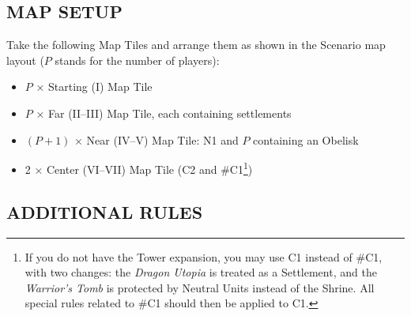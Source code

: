 \begin{multicols*}{2}
\subsection*{\MakeUppercase{Map Setup}}

Take the following Map Tiles and arrange them as shown in the Scenario map layout ($P$ stands for the number of players):
\begin{itemize}
  \item $P$ × Starting (I) Map Tile
  \item $P$ × Far (II--III) Map Tile, each containing settlements
  \item $(P + 1)$ × Near (IV--V) Map Tile:  N1 and $P$ containing an Obelisk
  \item 2 × Center (VI--VII) Map Tile (C2 and \#C1\footnote{If you do not have the Tower expansion, you may use C1 instead of \#C1, with two changes: the \textit{Dragon Utopia} is treated as a Settlement, and the \textit{Warrior's Tomb} is protected by Neutral Units instead of the Shrine. All special rules related to \#C1 should then be applied to C1.})
\end{itemize}

\subsection*{\MakeUppercase{Additional Rules}}


\end{multicols*}
